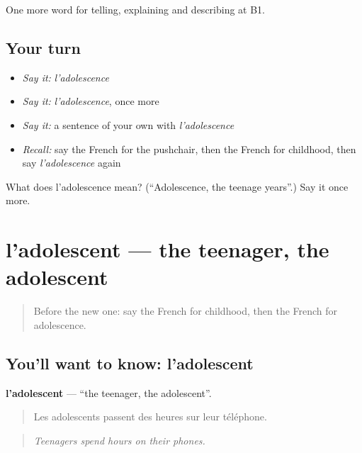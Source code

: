 \begin{grammarlens}[title={What you've built}]
One more word for telling, explaining and describing at B1.
\end{grammarlens}

\subsection*{Your turn}
\begin{itemize}
\raggedright
  \item \emph{Say it:} \emph{l'adolescence}
  \item \emph{Say it:} \emph{l'adolescence}, once more
  \item \emph{Say it:} a sentence of your own with \emph{l'adolescence}
  \item \emph{Recall:} say the French for the pushchair, then the French for childhood, then say \emph{l'adolescence} again
\end{itemize}

\begin{tcolorbox}[breakable,colback=teal!4,colframe=teal!35!black,title={Before you move on}]
What does l'adolescence mean? (\textquotedblleft{}Adolescence, the teenage years\textquotedblright{}.) Say it once more.
\end{tcolorbox}
\section[l'adolescent]{l'adolescent — the teenager, the adolescent}

\label{lesson:FR-C310-adolescent}



\begin{quote}
Before the new one: say the French for childhood, then the French for adolescence.
\end{quote}

\subsection*{You'll want to know: l'adolescent}
\textbf{l'adolescent} — \textquotedblleft{}the teenager, the adolescent\textquotedblright{}.

\begin{quote}
Les adolescents passent des heures sur leur téléphone.
\end{quote}

\begin{quote}
\emph{Teenagers spend hours on their phones.}
\end{quote}

